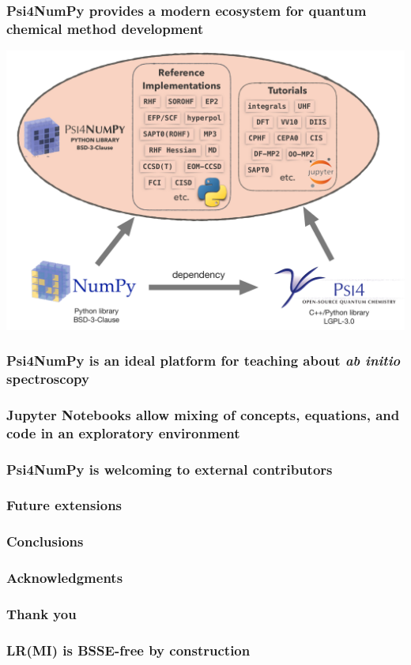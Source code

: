 \documentclass[%
    draft,%
    xcolor=usenames,dvipsnames,svgnames%
]{beamer}
\newcommand\pfn{Psi4NumPy}
\begin{document}
\begin{frame}
  \frametitle{\pfn{} provides a modern ecosystem for quantum chemical method development}
  \centering
  \includegraphics[width=\linewidth,keepaspectratio]{./figures/psi4numpy_ecosystem2.pdf}
\end{frame}

\begin{frame}
  \frametitle{\pfn{} is an ideal platform for teaching about \textit{ab initio} spectroscopy}
\end{frame}

\begin{frame}
  \frametitle{Jupyter Notebooks allow mixing of concepts, equations, and code in an exploratory environment}
\end{frame}

\begin{frame}
  \frametitle{\pfn{} is welcoming to external contributors}
\end{frame}

\begin{frame}
  \frametitle{Future extensions}
\end{frame}

\begin{frame}
  \frametitle{Conclusions}
\end{frame}

\begin{frame}
  \frametitle{Acknowledgments}
\end{frame}

\begin{frame}
  \frametitle{Thank you}
\end{frame}

\appendix

\begin{frame}
  \frametitle{LR(MI) is BSSE-free by construction}
\end{frame}

\immediate\closeout\tempfile
\end{document}
